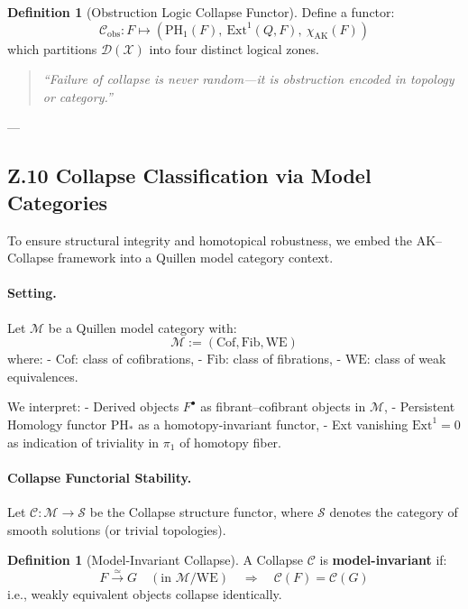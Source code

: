 \documentclass[11pt]{article}
\theoremstyle{definition}
\newtheorem{definition}[theorem]{Definition}
\begin{document}
\begin{definition}[Obstruction Logic Collapse Functor]
Define a functor:
\[
\mathcal{C}_{\text{obs}} : F \mapsto \left( \mathrm{PH}_1(F),\ \mathrm{Ext}^1(Q,F),\ \chi_{\text{AK}}(F) \right)
\]
which partitions $\mathcal{D}(\mathcal{X})$ into four distinct logical zones.
\end{definition}

\begin{quote}
\textit{“Failure of collapse is never random—it is obstruction encoded in topology or category.”}
\end{quote}

---

\subsection*{Z.10 Collapse Classification via Model Categories}

To ensure structural integrity and homotopical robustness, we embed the AK–Collapse framework into a Quillen model category context.

\paragraph{Setting.}
Let $\mathcal{M}$ be a Quillen model category with:
\[
\mathcal{M} := (\text{Cof}, \text{Fib}, \text{WE})
\]
where:
- $\text{Cof}$: class of cofibrations,
- $\text{Fib}$: class of fibrations,
- $\text{WE}$: class of weak equivalences.

We interpret:
- Derived objects $F^\bullet$ as fibrant–cofibrant objects in $\mathcal{M}$,
- Persistent Homology functor $\mathrm{PH}_*$ as a homotopy-invariant functor,
- Ext vanishing $\mathrm{Ext}^1 = 0$ as indication of triviality in $\pi_1$ of homotopy fiber.

\paragraph{Collapse Functorial Stability.}

Let $\mathcal{C} : \mathcal{M} \to \mathcal{S}$ be the Collapse structure functor,  
where $\mathcal{S}$ denotes the category of smooth solutions (or trivial topologies).

\begin{definition}[Model-Invariant Collapse]
A Collapse $\mathcal{C}$ is \textbf{model-invariant} if:
\[
F \xrightarrow{\simeq} G \quad (\text{in } \mathcal{M}/\text{WE}) \quad \Rightarrow \quad
\mathcal{C}(F) = \mathcal{C}(G)
\]
i.e., weakly equivalent objects collapse identically.
\end{definition}
\end{document}
